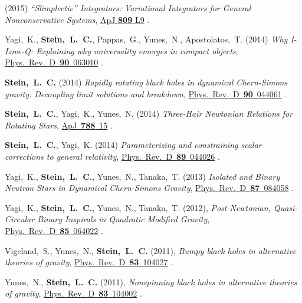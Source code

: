 \begin{etaremune}[start=\value{pubCounter}]
  (2015)
  {\it ``Slimplectic'' Integrators: Variational Integrators for General Nonconservative Systems},
  \href{http://dx.doi.org/10.1088/2041-8205/809/1/L9}{ApJ {\bf 809} L9}
  .
\item
  Yagi,~K., {\bf Stein,~L.~C.}, Pappas,~G., Yunes,~N., Apostolatos,~T.
  (2014)
  {\it Why I-Love-Q: Explaining why universality emerges in compact objects},
  \href{http://dx.doi.org/10.1103/PhysRevD.90.063010}{Phys.~Rev.~D~{\bf 90}~063010}
  .
\item
  {\bf Stein,~L.~C.}
  (2014)
  {\it Rapidly rotating black holes in dynamical Chern-Simons gravity:
    Decoupling limit solutions and breakdown},
  \href{http://dx.doi.org/10.1103/PhysRevD.90.044061}{Phys.~Rev.~D~{\bf 90}~044061}
  .
\item
  {\bf Stein,~L.~C.}, Yagi,~K., Yunes,~N.
  (2014)
  {\it Three-Hair Newtonian Relations for Rotating Stars},
  \href{http://dx.doi.org/10.1088/0004-637X/788/1/15}{ApJ~{\bf 788}~15}
  .
\item
  {\bf Stein,~L.~C.}, Yagi,~K.
  (2014)
  {\it Parameterizing and constraining scalar corrections to general relativity},
  \href{http://dx.doi.org/10.1103/PhysRevD.89.044026}{Phys.~Rev.~D~{\bf 89}~044026}
  .
\item
  Yagi,~K., {\bf Stein,~L.~C.}, Yunes,~N., Tanaka,~T.
  (2013)
  {\it Isolated and Binary Neutron Stars in Dynamical Chern-Simons Gravity},
  \href{http://dx.doi.org/10.1103/PhysRevD.87.084058}{Phys.~Rev.~D~{\bf 87}~084058}
  .
\item
  Yagi,~K., {\bf Stein,~L.~C.}, Yunes,~N., Tanaka,~T.
  (2012),
  {\it Post-Newtonian, Quasi-Circular Binary Inspirals in Quadratic Modified Gravity},
  \href{http://dx.doi.org/10.1103/PhysRevD.85.064022}{Phys.~Rev.~D~{\bf 85}~064022}
  .
\item
  Vigeland,~S., Yunes,~N., {\bf Stein,~L.~C.}
  (2011),
  {\it Bumpy black holes in alternative theories of gravity},
  \href{http://dx.doi.org/10.1103/PhysRevD.83.104027}{Phys.~Rev.~D~{\bf 83}~104027}
  .
\item
  Yunes,~N., {\bf Stein,~L.~C.}
  (2011),
  {\it Nonspinning black holes in alternative theories of gravity},
  \href{http://dx.doi.org/10.1103/PhysRevD.83.104002}{Phys.~Rev.~D~{\bf 83}~104002}
  .

\end{etaremune}
